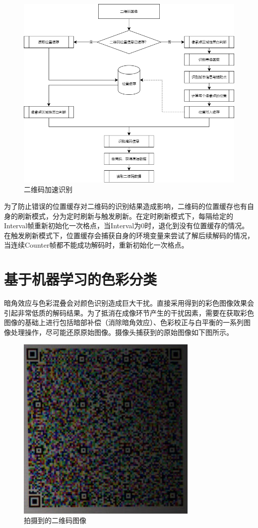 \begin{figure}[!htbp]
\centering
\includegraphics[scale=0.5]{figures/QR_Prf/QR_Fast.png}
\caption{二维码加速识别}
\end{figure}

为了防止错误的位置缓存对二维码的识别结果造成影响，二维码的位置缓存也有自身的刷新模式，分为定时刷新与触发刷新。在定时刷新模式下，每隔给定的Interval帧重新初始化一次格点，当Interval为0时，退化到没有位置缓存的情况。在触发刷新模式下，位置缓存会捕获自身的环境变量来尝试了解后续解码的情况，当连续Counter帧都不能成功解码时，重新初始化一次格点。

\section{基于机器学习的色彩分类}

暗角效应与色彩混叠会对颜色识别造成巨大干扰。直接采用得到的彩色图像效果会引起非常低质的解码结果。为了抵消在成像环节产生的干扰因素，需要在获取彩色图像的基础上进行包括暗部补偿（消除暗角效应）、色彩校正与白平衡的一系列图像处理操作，尽可能还原原始图像。摄像头捕获到的原始图像如下图所示。

\begin{figure}[!htbp]
\centering
\includegraphics[scale=1]{figures/QR_Cap_RAW.png}
\caption{拍摄到的二维码图像}
\end{figure}

